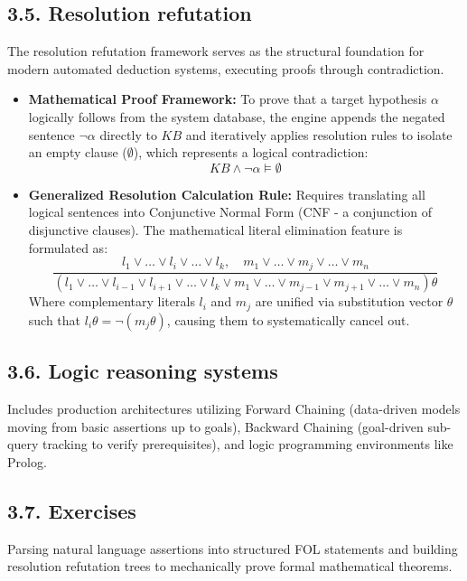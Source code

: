 \documentclass[../main.tex]{subfiles}
\begin{document}
\subsection{3.5. Resolution refutation}
The resolution refutation framework serves as the structural foundation for modern automated deduction systems, executing proofs through contradiction.
\begin{itemize}
    \item \textbf{Mathematical Proof Framework:} To prove that a target hypothesis $\alpha$ logically follows from the system database, the engine appends the negated sentence $\neg\alpha$ directly to $KB$ and iteratively applies resolution rules to isolate an empty clause ($\emptyset$), which represents a logical contradiction:
    \begin{equation}
        KB \wedge \neg\alpha \models \emptyset
    \end{equation}
    \item \textbf{Generalized Resolution Calculation Rule:} Requires translating all logical sentences into Conjunctive Normal Form (CNF - a conjunction of disjunctive clauses). The mathematical literal elimination feature is formulated as:
    \begin{equation}
        \frac{l_1 \vee \dots \vee l_i \vee \dots \vee l_k, \quad m_1 \vee \dots \vee m_j \vee \dots \vee m_n}{(l_1 \vee \dots \vee l_{i-1} \vee l_{i+1} \vee \dots \vee l_k \vee m_1 \vee \dots \vee m_{j-1} \vee m_{j+1} \vee \dots \vee m_n)\theta}
    \end{equation}
    Where complementary literals $l_i$ and $m_j$ are unified via substitution vector $\theta$ such that $l_i\theta = \neg (m_j\theta)$, causing them to systematically cancel out.
\end{itemize}

\subsection{3.6. Logic reasoning systems}
Includes production architectures utilizing Forward Chaining (data-driven models moving from basic assertions up to goals), Backward Chaining (goal-driven sub-query tracking to verify prerequisites), and logic programming environments like Prolog.

\subsection{3.7. Exercises}
Parsing natural language assertions into structured FOL statements and building resolution refutation trees to mechanically prove formal mathematical theorems.
\end{document}
